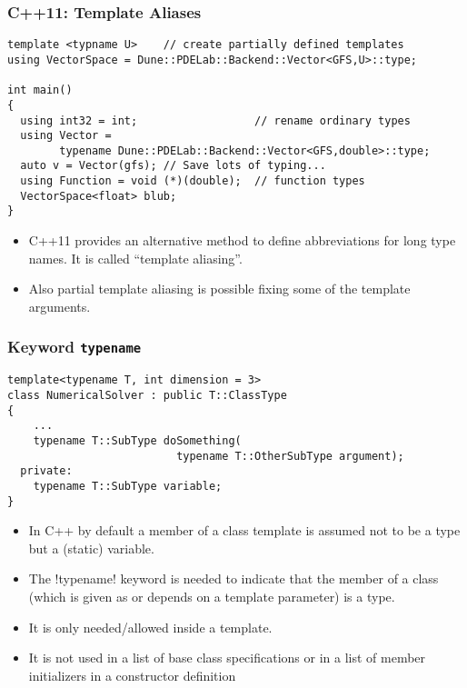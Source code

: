 \begin{frame}[fragile]
\frametitle{C++11: Template Aliases}
\begin{lstlisting}
template <typname U>    // create partially defined templates 
using VectorSpace = Dune::PDELab::Backend::Vector<GFS,U>::type;

int main()
{
  using int32 = int;                  // rename ordinary types
  using Vector = 
        typename Dune::PDELab::Backend::Vector<GFS,double>::type;
  auto v = Vector(gfs); // Save lots of typing...
  using Function = void (*)(double);  // function types
  VectorSpace<float> blub;
}
\end{lstlisting}


\begin{itemize}
\item C++11 provides an alternative method to define abbreviations for long type names.
It is called ``template aliasing''.
\item Also partial template aliasing is possible fixing some of the template arguments.
\end{itemize}

\end{frame}



\begin{frame}[fragile]
\frametitle{Keyword \texttt{typename}}
\begin{lstlisting}
template<typename T, int dimension = 3>
class NumericalSolver : public T::ClassType
{
    ...
    typename T::SubType doSomething(
                          typename T::OtherSubType argument);
  private:
    typename T::SubType variable;
}
\end{lstlisting}
\begin{itemize}%
\item In C++ by default a member of a class template is assumed not to be a type but
a (static) variable.
\item The \inline!typename! keyword is needed to
indicate that the member of a class (which is given as or depends on a template
parameter) is a type.
\item It is only needed/allowed inside a template.
\item It is not used in a list of base class specifications or in a list of member initializers
in a constructor definition
\end{itemize}

\end{frame}


